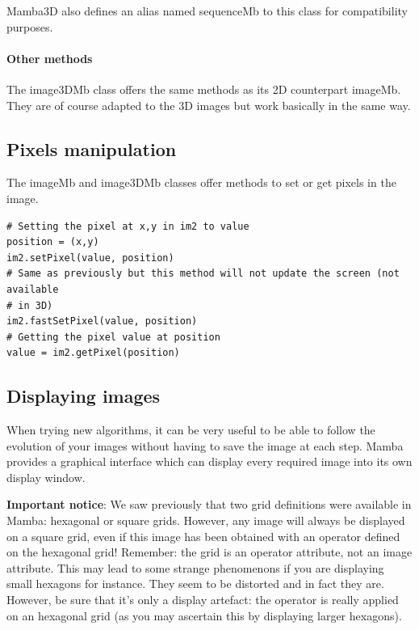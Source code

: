 \documentclass[a4paper,10pt,oneside]{article}
\begin{document}
Mamba3D also defines an alias named sequenceMb to this class for compatibility
purposes.

\paragraph{Other methods}

The image3DMb class offers the same methods as its 2D counterpart imageMb. They
are of course adapted to the 3D images but work basically in the same way.

\subsection{Pixels manipulation}

The imageMb and image3DMb classes offer methods to set or get pixels
in the image.

\lstset{language=Python}
\begin{lstlisting}
# Setting the pixel at x,y in im2 to value
position = (x,y)
im2.setPixel(value, position)
# Same as previously but this method will not update the screen (not available
# in 3D)
im2.fastSetPixel(value, position)
# Getting the pixel value at position
value = im2.getPixel(position)
\end{lstlisting}

\subsection{Displaying images}
\label{cha:disp_im}

When trying new algorithms, it can be very useful to be able to follow the 
evolution of your images without having to save the image at each step. Mamba
provides a graphical interface which can display every required image into
its own display window.

\textbf{Important notice}: We saw previously that two grid definitions were 
available in Mamba: hexagonal or square grids. However, any image will always be 
displayed on a square grid, even if this image has been obtained with an operator 
defined on the hexagonal grid! Remember: the grid is an operator attribute, not an 
image attribute. This may lead to some strange phenomenons if you are displaying 
small hexagons for instance. They seem to be distorted and in fact they are. However, 
be sure that it's only a display artefact: the operator is really applied on an hexagonal 
grid (as you may ascertain this by displaying larger hexagons).
\end{document}
